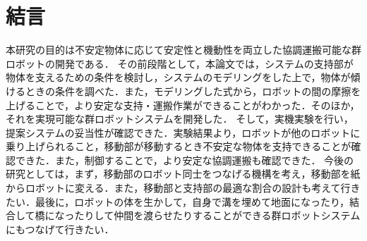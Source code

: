 \chapter{結言}
本研究の目的は不安定物体に応じて安定性と機動性を両立した協調運搬可能な群ロボットの開発である．
その前段階として，本論文では，システムの支持部が物体を支えるための条件を検討し，システムのモデリングをした上で，物体が傾けるときの条件を調べた．また，モデリングした式から，ロボットの間の摩擦を上げることで，より安定な支持・運搬作業ができることがわかった．そのほか，それを実現可能な群ロボットシステムを開発した．
そして，実機実験を行い，提案システムの妥当性が確認できた．実験結果より，ロボットが他のロボットに乗り上げられること，移動部が移動するとき不安定な物体を支持できることが確認できた．また，制御することで，より安定な協調運搬も確認できた．
今後の研究としては，まず，移動部のロボット同士をつなげる機構を考え，移動部を紙からロボットに変える．また，移動部と支持部の最適な割合の設計も考えて行きたい．最後に，ロボットの体を生かして，自身で溝を埋めて地面になったり，結合して橋になったりして仲間を渡らせたりすることができる群ロボットシステムにもつなげて行きたい．